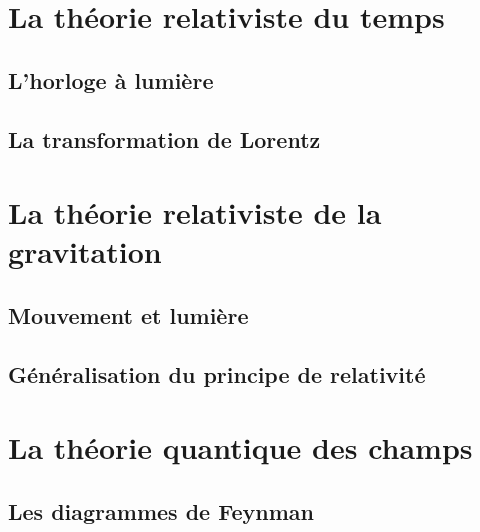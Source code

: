 \chapter{La théorie relativiste du temps}
  \section{L'horloge à lumière}
  \section{La transformation de Lorentz}

\chapter{La théorie relativiste de la gravitation}
  \section{Mouvement et lumière}
\section{Généralisation du principe de relativité}

\chapter{La théorie quantique des champs}
  \section{Les diagrammes de Feynman}




